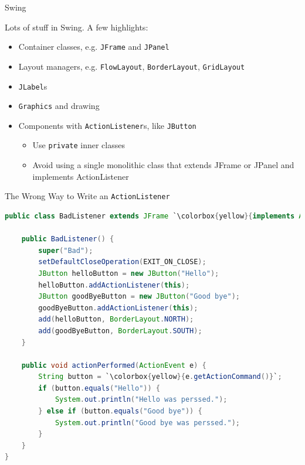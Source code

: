 \documentclass{beamer}
\begin{document}
\begin{frame}[fragile]{Swing}


Lots of stuff in Swing.  A few highlights:
\begin{itemize}
\item Container classes, e.g. {\tt JFrame} and {\tt JPanel}
\item Layout managers, e.g. {\tt FlowLayout}, {\tt BorderLayout}, {\tt GridLayout}
\item {\tt JLabel}s
\item {\tt Graphics} and drawing
\item Components with {\tt ActionListener}s, like {\tt JButton}
\begin{itemize}
\item Use {\tt private} inner classes
\item Avoid using a single monolithic class that extends JFrame or JPanel and implements ActionListener
\end{itemize}
\end{itemize}


\end{frame}

\begin{frame}[fragile]{The Wrong Way to Write an {\tt ActionListener}}


\begin{lstlisting}[language=Java,escapechar=`]
public class BadListener extends JFrame `\colorbox{yellow}{implements ActionListener}` {

    public BadListener() {
        super("Bad");
        setDefaultCloseOperation(EXIT_ON_CLOSE);
        JButton helloButton = new JButton("Hello");
        helloButton.addActionListener(this);
        JButton goodByeButton = new JButton("Good bye");
        goodByeButton.addActionListener(this);
        add(helloButton, BorderLayout.NORTH);
        add(goodByeButton, BorderLayout.SOUTH);
    }

    public void actionPerformed(ActionEvent e) {
        String button = `\colorbox{yellow}{e.getActionCommand()}`;
        if (button.equals("Hello")) {
            System.out.println("Hello was perssed.");
        } else if (button.equals("Good bye")) {
            System.out.println("Good bye was perssed.");
        }
    }
}
\end{lstlisting}

\end{frame}
\end{document}
